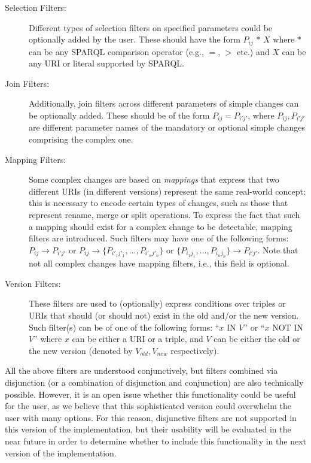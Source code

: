 \begin{description}
\item[Selection Filters:] Different types of selection filters on specified parameters could be optionally added by the user. 
These should have the form $P_{ij}$ $\ast$ $X$ where $\ast$ can be any SPARQL comparison operator (e.g., $=$, $>$ etc.) and $X$ can be any URI or literal supported by SPARQL.

\item[Join Filters:] Additionally, join filters across different parameters of simple changes can be optionally added. 
These should be of the form $P_{ij} = P_{i'j'}$, where $P_{ij}, P_{i'j'}$ are different parameter names of the mandatory or optional simple changes comprising the complex one.

\item[Mapping Filters:] Some complex changes are based on \textit{mappings} that express that two different URIs (in different versions) represent the same real-world concept; this is necessary to encode certain types of changes, such as those that represent rename, merge or split operations. 
To express the fact that such a mapping should exist for a complex change to be detectable, mapping filters are introduced. Such filters may have one of the following forms: 
$P_{ij} \rightarrow P_{i'j'}$ or
$P_{ij} \rightarrow \{P_{i'_1 j'_1}, \dots, P_{i'_n j'_n}\}$ or
$\{P_{i_1 j_1}, \dots, P_{i_n j_n}\} \rightarrow P_{i'j'}$.
Note that not all complex changes have mapping filters, i.e., this field is optional.

\item[Version Filters:] These filters are used to (optionally) express conditions over triples or URIs that should (or should not) exist in the old and/or the new version. Such filter(s) can be of one of the following forms: 
``$x$ IN $V$'' or ``$x$ NOT IN $V$'' where $x$ can be either a URI or a triple, and $V$ can be either the old or the new version (denoted by $V_{old}, V_{new}$ respectively).

\end{description}

All the above filters are understood conjunctively, but filters combined via disjunction (or a combination of disjunction and conjunction) are also technically possible.
However, it is an open issue whether this functionality could be useful for the user, as we believe that this sophisticated version could overwhelm the user with many options. 
For this reason, disjunctive filters are not supported in this version of the implementation, but their usability will be evaluated in the near future in order to determine whether to include this functionality in the next version of the implementation.



